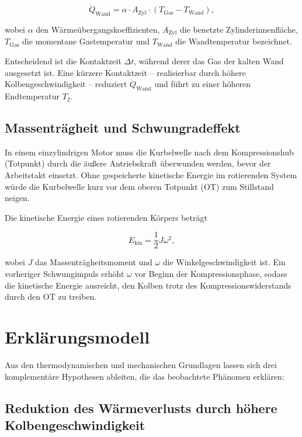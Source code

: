 ﻿\documentclass[a4paper,12pt]{article}
\begin{document}
\begin{equation}
  \dot{Q}_\text{Wand} = \alpha \cdot A_\text{Zyl} \cdot (T_\text{Gas} - T_\text{Wand}),
  \label{eq:waerme}
\end{equation}

\noindent
wobei $\alpha$ den Wärmeübergangskoeffizienten, $A_\text{Zyl}$ die benetzte
Zylinderinnenfläche, $T_\text{Gas}$ die momentane Gastemperatur und $T_\text{Wand}$
die Wandtemperatur bezeichnet.

Entscheidend ist die Kontaktzeit $\Delta t$, während derer das Gas der kalten Wand
ausgesetzt ist. Eine kürzere Kontaktzeit -- realisierbar durch höhere Kolbengeschwindigkeit
-- reduziert $\dot{Q}_\text{Wand}$ und führt zu einer höheren Endtemperatur $T_2$.

\subsection{Massenträgheit und Schwungradeffekt}

In einem einzylindrigen Motor muss die Kurbelwelle nach dem Kompressionshub
(Totpunkt) durch die äußere Antriebskraft überwunden werden, bevor der Arbeitstakt
einsetzt. Ohne gespeicherte kinetische Energie im rotierenden System würde die
Kurbelwelle kurz vor dem oberen Totpunkt (OT) zum Stillstand neigen.

Die kinetische Energie eines rotierenden Körpers beträgt

\begin{equation}
  E_\text{kin} = \frac{1}{2} J \omega^2,
  \label{eq:ekin}
\end{equation}

\noindent
wobei $J$ das Massenträgheitsmoment und $\omega$ die Winkelgeschwindigkeit ist.
Ein vorheriger Schwungimpuls erhöht $\omega$ vor Beginn der Kompressionsphase,
sodass die kinetische Energie ausreicht, den Kolben trotz des Kompressionswiderstands
durch den OT zu treiben.

\section{Erklärungsmodell}

Aus den thermodynamischen und mechanischen Grundlagen lassen sich drei komplementäre
Hypothesen ableiten, die das beobachtete Phänomen erklären:

\subsection{Reduktion des Wärmeverlusts durch höhere Kolbengeschwindigkeit}
\end{document}
